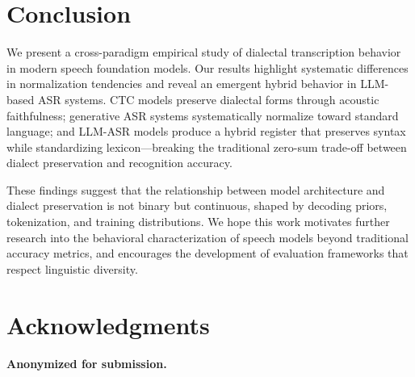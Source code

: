 \documentclass[11pt]{article}
\begin{document}
\section{Conclusion}

We present a cross-paradigm empirical study of dialectal transcription behavior in modern speech foundation models. Our results highlight systematic differences in normalization tendencies and reveal an emergent hybrid behavior in LLM-based ASR systems. CTC models preserve dialectal forms through acoustic faithfulness; generative ASR systems systematically normalize toward standard language; and LLM-ASR models produce a hybrid register that preserves syntax while standardizing lexicon—breaking the traditional zero-sum trade-off between dialect preservation and recognition accuracy.

These findings suggest that the relationship between model architecture and dialect preservation is not binary but continuous, shaped by decoding priors, tokenization, and training distributions. We hope this work motivates further research into the behavioral characterization of speech models beyond traditional accuracy metrics, and encourages the development of evaluation frameworks that respect linguistic diversity.

\section*{Acknowledgments}

\textbf{Anonymized for submission.}


\end{document}
